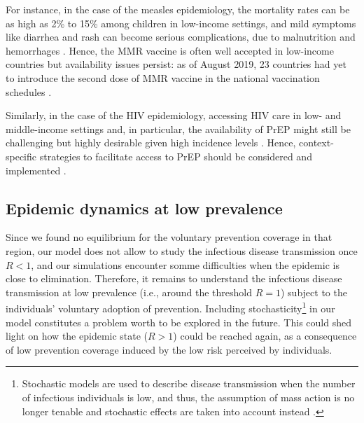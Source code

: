 For instance, in the case of the measles epidemiology, the mortality rates can be as high as 2\% to 15\% among children in low-income settings, and mild symptoms like diarrhea and rash can become serious complications, due to malnutrition and hemorrhages \cite[]{Sever2011}. Hence, the MMR vaccine is often well accepted in low-income countries \cite[]{Larson2016} but availability issues persist: as of August 2019, 23 countries had yet to introduce the second dose of MMR vaccine in the national vaccination schedules \cite[]{WHO_MeaslesWW2019}. 

Similarly, in the case of the HIV epidemiology, accessing HIV care in low- and middle-income settings and, in particular, the availability of PrEP might still be challenging but highly desirable given high incidence levels \cite[]{UNAIDS_Data2019}. Hence, context-specific strategies to facilitate access to PrEP should be considered and implemented \cite[]{Rebe2019}. 

\subsection{Epidemic dynamics at low prevalence}
Since we found no equilibrium for the voluntary prevention coverage in that region, our model does not allow to study the infectious disease transmission once $R<1$, and our simulations encounter somme difficulties when the epidemic is close to elimination. Therefore, it remains to understand the infectious disease transmission at low prevalence (i.e., around the threshold $R=1$) subject to the individuals' voluntary adoption of prevention. Including stochasticity\footnote{Stochastic models are used to describe disease transmission when the number of infectious individuals is low, and thus, the assumption of mass action is no longer tenable and stochastic effects are taken into account instead \cite[]{Brauer2008}.} in our model constitutes a problem worth to be explored in the future. This could shed light on how the epidemic state ($R>1$) could be reached again, as a consequence of low prevention coverage induced by the low risk perceived by individuals. 

